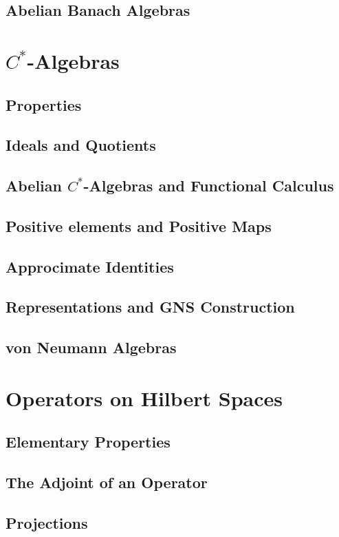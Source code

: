 \documentclass[a4paper, 11pt]{report}
\begin{document}
	\subsection{Abelian Banach Algebras}

	\section{$C^*$-Algebras}
	\subsection{Properties}
	\subsection{Ideals and Quotients}
	\subsection{Abelian $C^*$-Algebras and Functional Calculus}
	\subsection{Positive elements and Positive Maps}
	\subsection{Approcimate Identities}
	\subsection{Representations and GNS Construction}
	\subsection{von Neumann Algebras}

	\section{Operators on Hilbert Spaces}
	\subsection{Elementary Properties}
	\subsection{The Adjoint of an Operator}
	\subsection{Projections}
\end{document}
